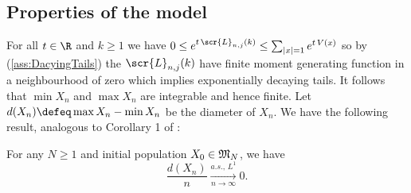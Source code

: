 \subsection{Properties of the model}
For all $t\in\R$ and $k \geq 1$ we have $0 \leq e^{t\, \scr{L}_{n,j}(k)} \leq \sum_{|x|=1} e^{t\, V(x)}$ so by (\ref{ass:DacyingTails}) the $\scr{L}_{n,j}(k)$ have finite moment generating function in a neighbourhood of zero which implies exponentially decaying tails. It follows that $\min X_n$ and $\max X_n$ are integrable and hence finite. Let $d(X_n) \defeq \max X_n - \min X_n$ be the diameter of $X_n$. We have the following result, analogous to Corollary 1 of \cite{exp_tails}: 

\begin{proposition}\label{prop:diameter}
For any $N \geq 1$ and initial population $X_0 \in \frak{M}_N$, we have 
\begin{equation*}
\frac{d(X_n)}{n} \xrightarrow[n \to \infty]{a.s.,\, L^1} 0. 
\end{equation*}
\end{proposition}

